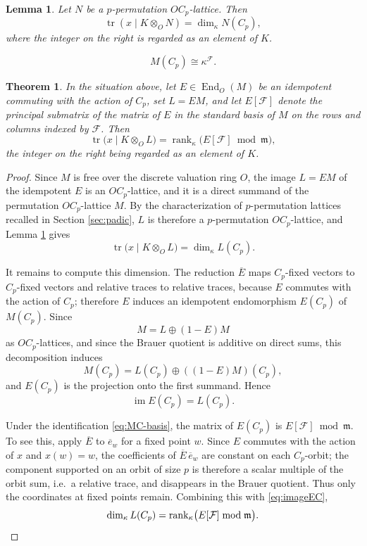 \documentclass[10pt,a4paper]{amsart}
\newtheorem{lemma}{Lemma}
\newtheorem{theorem}{Theorem}
\newcommand{\rank}{\operatorname{rank}}
\newcommand{\tr}{\operatorname{tr}}
\begin{document}
\begin{lemma}\label{lem:trace-brauer}
Let $N$ be a $p$-permutation $OC_p$-lattice.  Then
\[
 \tr\left(x\mid K\otimes_{O}N\right)=\dim_{\kappa}N(C_p),
\]
where the integer on the right is regarded as an element of $K$.
\end{lemma}

\begin{equation}\label{eq:MC-basis}
 M(C_p)\cong \kappa^{\mathcal F}.
\end{equation}

\begin{theorem}\label{thm:local}
In the situation above, let $E\in\operatorname{End}_O(M)$ be an idempotent commuting with the action of $C_p$,
set $L=EM$,
and let $E[\mathcal F]$ denote the principal submatrix of the matrix of $E$ in the standard basis of $M$ on the rows and columns indexed by $\mathcal F$.
Then
\[
 \tr\bigl(x\mid K\otimes_O L\bigr)=\rank_{\kappa}\bigl(E[\mathcal F]\bmod \mathfrak m\bigr),
\]
the integer on the right being regarded as an element of $K$.
\end{theorem}

\begin{proof}
Since $M$ is free over the discrete valuation ring $O$, the image $L=EM$ of the idempotent $E$ is an $OC_p$-lattice,
and it is a direct summand of the permutation $OC_p$-lattice $M$.
By the characterization of $p$-permutation lattices recalled in Section \ref{sec:padic},
$L$ is therefore a $p$-permutation $OC_p$-lattice, and Lemma \ref{lem:trace-brauer} gives
\[
 \tr\bigl(x\mid K\otimes_O L\bigr)=\dim_\kappa L(C_p).
\]

It remains to compute this dimension.
The reduction $\overline E$ maps $C_p$-fixed vectors to $C_p$-fixed vectors and relative traces to relative traces,
because $E$ commutes with the action of $C_p$; therefore $E$ induces an idempotent endomorphism $E(C_p)$ of $M(C_p)$.
Since
\[
 M=L\oplus (1-E)M
\]
as $OC_p$-lattices, and since the Brauer quotient is additive on direct sums, this decomposition induces
\[
 M(C_p)=L(C_p)\oplus ((1-E)M)(C_p),
\]
and $E(C_p)$ is the projection onto the first summand.  Hence
\begin{equation}\label{eq:imageEC}
 \operatorname{im}E(C_p)=L(C_p).
\end{equation}

Under the identification \eqref{eq:MC-basis}, the matrix of $E(C_p)$ is $E[\mathcal F]\bmod\mathfrak m$.
To see this, apply $\overline E$ to $\overline e_w$ for a fixed point $w$.
Since $E$ commutes with the action of $x$ and $x(w)=w$,
the coefficients of $\overline E\,\overline e_w$ are constant on each $C_p$-orbit;
the component supported on an orbit of size $p$ is therefore a scalar multiple of the orbit sum,
i.e.\ a relative trace, and disappears in the Brauer quotient.
Thus only the coordinates at fixed points remain.
Combining this with \eqref{eq:imageEC},
\[
 \dim_\kappa L(C_p)=\rank_\kappa\bigl(E[\mathcal F]\bmod\mathfrak m\bigr).\qedhere
\]
\end{proof}
\end{document}
